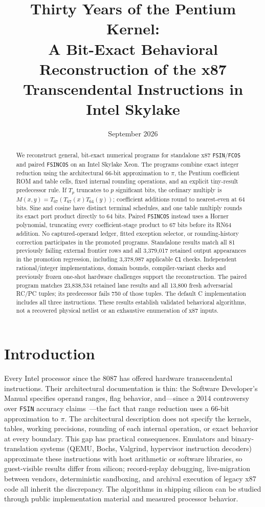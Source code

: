 \documentclass[11pt]{article}
\title{Thirty Years of the Pentium Kernel:\\
A Bit-Exact Behavioral Reconstruction of the x87\\
Transcendental Instructions in Intel Skylake}
\author{}
\date{September 2026}
\newcommand{\instr}[1]{\texttt{#1}}
\begin{document}
\maketitle

\begin{abstract}
We reconstruct general, bit-exact numerical programs for standalone x87
\instr{FSIN}/\instr{FCOS} and paired \instr{FSINCOS} on an Intel Skylake Xeon.
The programs combine
exact integer reduction using the architectural 66-bit approximation to
$\pi$, the Pentium coefficient ROM and table cells, fixed internal rounding
operations, and an explicit tiny-result predecessor rule. If $T_p$ truncates
to $p$ significant bits, the ordinary multiply is
$M(x,y)=T_{67}(T_{67}(x)T_{64}(y))$; coefficient additions round to nearest-even
at 64 bits. Sine and cosine have distinct terminal schedules, and one table
multiply rounds its exact port product directly to 64 bits.
Paired \instr{FSINCOS} instead uses a Horner polynomial, truncating every
coefficient-stage product to 67 bits before its RN64 addition.
No captured-operand ledger, fitted exception selector, or rounding-history
correction participates in the promoted programs.
Standalone results match all 81 previously failing external frontier rows and all
3{,}379{,}017 retained output appearances in the promotion regression, including
3{,}378{,}987 applicable \texttt{C1} checks. Independent rational/integer
implementations, domain bounds, compiler-variant checks and previously frozen
one-shot hardware challenges support the reconstruction.
The paired program matches 23{,}838{,}534 retained lane results and all
13{,}800 fresh adversarial RC/PC tuples; its predecessor fails 750 of those
tuples. The default C implementation includes all three instructions.
These results establish validated behavioral algorithms, not a recovered
physical netlist or an exhaustive enumeration of x87 inputs.
\end{abstract}

\section{Introduction}

Every Intel processor since the 8087 has offered hardware
transcendental instructions.  Their architectural documentation is
thin: the Software Developer's Manual specifies operand ranges, flag
behavior, and---since a 2014 controversy over \instr{FSIN} accuracy
claims~\cite{dawson2014,intel-sdm}---the fact that range reduction
uses a 66-bit approximation to $\pi$.  The architectural description
does not specify the kernels, tables, working precisions, rounding of
each internal operation, or exact behavior at every boundary.
This gap has practical consequences.  Emulators and binary-translation
systems (QEMU, Bochs, Valgrind, hypervisor instruction decoders)
approximate these instructions with host arithmetic or software
libraries, so guest-visible results differ from silicon; record-replay
debugging, live-migration between vendors, deterministic sandboxing,
and archival execution of legacy x87 code all inherit the discrepancy.
The algorithms in shipping silicon can be studied through public
implementation material and measured processor behavior.
\end{document}
